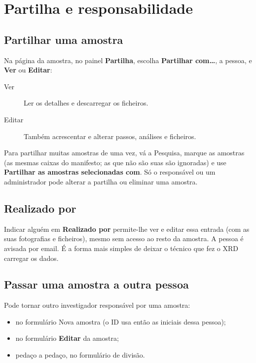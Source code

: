 \documentclass[11pt,a4paper]{article}
\newcommand{\ui}[1]{\textsf{\textbf{#1}}}
\newcommand{\menu}[1]{\textsf{#1}}
\begin{document}
\section{Partilha e responsabilidade}

\subsection{Partilhar uma amostra}

Na página da amostra, no painel \ui{Partilha}, escolha \ui{Partilhar
com\ldots}, a pessoa, e \ui{Ver} ou \ui{Editar}:

\begin{description}
  \item[Ver] Ler os detalhes e descarregar os ficheiros.
  \item[Editar] Também acrescentar e alterar passos, análises e ficheiros.
\end{description}

Para partilhar muitas amostras de uma vez, vá a \menu{Pesquisa}, marque as
amostras (as mesmas caixas do manifesto; as que não são suas são ignoradas) e use \ui{Partilhar as
amostras selecionadas com}. Só o responsável ou um administrador pode
alterar a partilha ou eliminar uma amostra.

\subsection{Realizado por}

Indicar alguém em \ui{Realizado por} permite-lhe ver e editar essa entrada
(com as suas fotografias e ficheiros), mesmo sem acesso ao resto da
amostra. A pessoa é avisada por email. É a forma mais simples de deixar o
técnico que fez o XRD carregar os dados.

\subsection{Passar uma amostra a outra pessoa}
\label{sec:assign}

Pode tornar outro investigador responsável por uma amostra:
\begin{itemize}
  \item no formulário \menu{Nova amostra} (o ID usa então as iniciais dessa
        pessoa);
  \item no formulário \ui{Editar} da amostra;
  \item pedaço a pedaço, no formulário de divisão.
\end{itemize}
\end{document}
